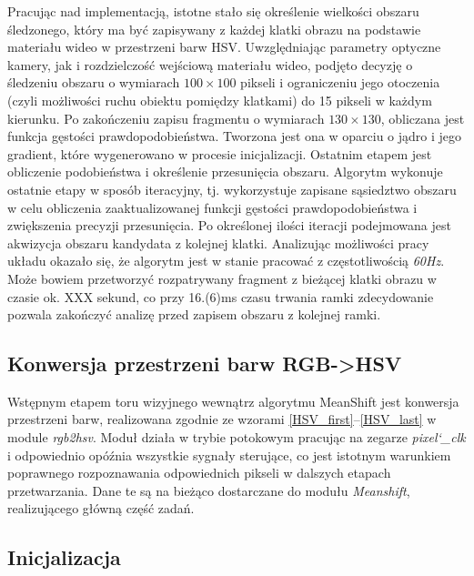 Pracując nad implementacją, istotne stało się określenie wielkości obszaru śledzonego, który ma być zapisywany z każdej klatki obrazu na podstawie materiału wideo w przestrzeni barw HSV.
Uwzględniając parametry optyczne kamery, jak i rozdzielczość wejściową materiału wideo, podjęto decyzję o śledzeniu obszaru o wymiarach $100 \times 100$ pikseli i ograniczeniu jego otoczenia (czyli możliwości ruchu obiektu pomiędzy klatkami) do 15 pikseli w każdym kierunku.
Po zakończeniu zapisu fragmentu o wymiarach $130 \times 130$, obliczana jest funkcja gęstości prawdopodobieństwa. Tworzona jest ona w oparciu o jądro i jego gradient, które wygenerowano w procesie inicjalizacji. Ostatnim etapem jest obliczenie podobieństwa i określenie przesunięcia obszaru. Algorytm wykonuje ostatnie etapy w sposób iteracyjny, tj. wykorzystuje zapisane sąsiedztwo obszaru w celu obliczenia zaaktualizowanej funkcji gęstości prawdopodobieństwa i zwiększenia precyzji przesunięcia. Po określonej ilości iteracji podejmowana jest akwizycja obszaru kandydata z kolejnej klatki.
Analizując możliwości pracy układu okazało się, że algorytm jest w stanie pracować z częstotliwością \textit{60Hz}. Może bowiem przetworzyć rozpatrywany fragment z bieżącej klatki obrazu w czasie ok. XXX sekund, co przy 16.(6)ms czasu trwania ramki zdecydowanie pozwala zakończyć analizę przed zapisem obszaru z kolejnej ramki.  %



\subsection{Konwersja przestrzeni barw RGB->HSV}

Wstępnym etapem toru wizyjnego wewnątrz algorytmu MeanShift jest konwersja przestrzeni barw, realizowana zgodnie ze wzorami \eqref{HSV_first}--\eqref{HSV_last} w module \textit{rgb2hsv}. %
Moduł działa w trybie potokowym pracując na zegarze \textit{pixel\char`_clk} i odpowiednio opóźnia wszystkie sygnały sterujące, co jest istotnym warunkiem poprawnego rozpoznawania odpowiednich pikseli w dalszych etapach przetwarzania.
Dane te są na bieżąco dostarczane do modułu \textit{Meanshift}, realizującego główną część zadań. 

\subsection{Inicjalizacja}


